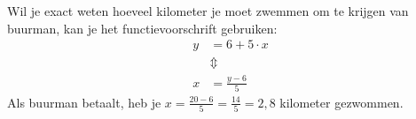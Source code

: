 Wil je exact weten hoeveel kilometer je moet zwemmen om  te krijgen van buurman, kan je het functievoorschrift gebruiken:
\[
\begin{split}
y&=6+5\cdot x\\
& \Updownarrow\\
x&=\frac{y-6}{5}
\end{split}
\]
Als buurman  betaalt, heb je $x=\frac{20-6}{5}=\frac{14}{5}=2,8$ kilometer gezwommen.



